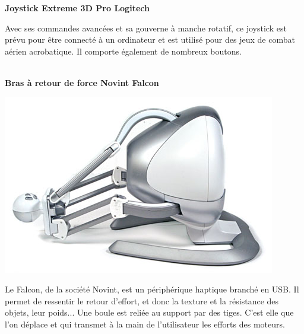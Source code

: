 \textbf{Joystick Extreme 3D Pro Logitech}
\\
	\hfill
	\begin{minipage}{0.8\textwidth}
	Avec ses commandes avancées et sa gouverne à manche rotatif, ce joystick est prévu pour être connecté à un ordinateur et est utilisé pour des jeux de combat aérien acrobatique. Il comporte également de nombreux boutons.
	\end{minipage}
\\

\textbf{Bras à retour de force Novint Falcon}
\\
\noindent\begin{minipage}{0.2\textwidth}
			\includegraphics[width=\linewidth]{1-PreEtude/img/falcon}
			\end{minipage}
			\hfill
			\begin{minipage}{0.8\textwidth}
			Le Falcon, de la société Novint, est un périphérique haptique branché en USB. Il permet de ressentir le retour d'effort, et donc la texture et la résistance des objets, leur poids... Une boule est reliée au support par des tiges. C'est elle que l'on déplace et qui transmet à la main de l'utilisateur les efforts des moteurs.
		\end{minipage}
\\

